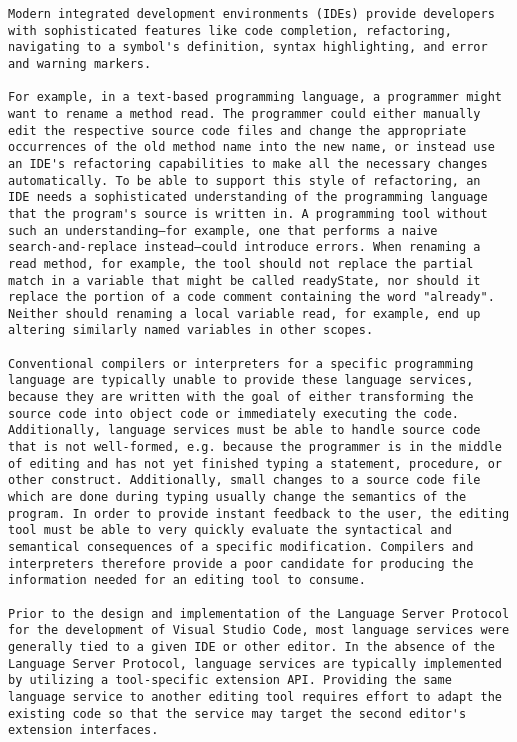 \documentclass[12pt, a4paper]{report}
\begin{document}
\begin{verbatim}
Modern integrated development environments (IDEs) provide developers
with sophisticated features like code completion, refactoring,
navigating to a symbol's definition, syntax highlighting, and error
and warning markers.

For example, in a text-based programming language, a programmer might
want to rename a method read. The programmer could either manually
edit the respective source code files and change the appropriate
occurrences of the old method name into the new name, or instead use
an IDE's refactoring capabilities to make all the necessary changes
automatically. To be able to support this style of refactoring, an
IDE needs a sophisticated understanding of the programming language
that the program's source is written in. A programming tool without
such an understanding—for example, one that performs a naive
search-and-replace instead—could introduce errors. When renaming a
read method, for example, the tool should not replace the partial
match in a variable that might be called readyState, nor should it
replace the portion of a code comment containing the word "already".
Neither should renaming a local variable read, for example, end up
altering similarly named variables in other scopes.

Conventional compilers or interpreters for a specific programming
language are typically unable to provide these language services,
because they are written with the goal of either transforming the
source code into object code or immediately executing the code.
Additionally, language services must be able to handle source code
that is not well-formed, e.g. because the programmer is in the middle
of editing and has not yet finished typing a statement, procedure, or
other construct. Additionally, small changes to a source code file
which are done during typing usually change the semantics of the
program. In order to provide instant feedback to the user, the editing
tool must be able to very quickly evaluate the syntactical and
semantical consequences of a specific modification. Compilers and
interpreters therefore provide a poor candidate for producing the
information needed for an editing tool to consume.

Prior to the design and implementation of the Language Server Protocol
for the development of Visual Studio Code, most language services were
generally tied to a given IDE or other editor. In the absence of the
Language Server Protocol, language services are typically implemented
by utilizing a tool-specific extension API. Providing the same
language service to another editing tool requires effort to adapt the
existing code so that the service may target the second editor's
extension interfaces.


\end{verbatim}
\end{document}
